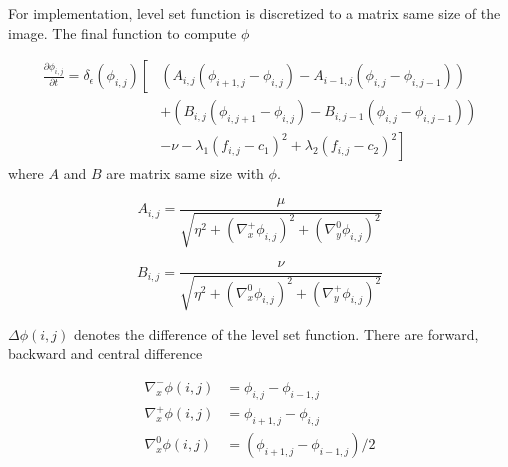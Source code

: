 For implementation, level set function is discretized to a matrix same size of the image. The final function to compute $\phi$

\begin{equation}
    \begin{aligned}
            \frac{\partial \phi_{i, j}}{\partial t} = 
            \delta_{\epsilon}(\phi_{i,j}) \left[ \right.
                    & \left( A_{i,j}(\phi_{i+1, j} - \phi_{i,j})
                            - A_{i-1,j}(\phi_{i, j} - \phi_{i,j-1}) \right) \\
                    & + \left( B_{i, j}(\phi_{i, j+1} - \phi_{i, j}) - 
                             B_{i, j-1}(\phi_{i, j} - \phi_{i, j-1}) \right) \\
                    & - \nu - 
                        \lambda_1(f_{i,j} - c_1)^2 +
                        \lambda_2(f_{i, j} - c_2)^2 
                        \left. \right]
    \end{aligned}
    \label{eq:phi}
\end{equation}
where $A$ and $B$ are matrix same size with $\phi$.

\begin{equation}
    A_{i, j} = \frac{\mu}
                {\sqrt{\eta^2 
                       + (\nabla_x^+ \phi_{i, j} )^2
                       + (\nabla_y^0 \phi_{i, j} )^2 }
                }
    \label{eq:a}
\end{equation}

\begin{equation}
    B_{i, j} = \frac{\nu}
                    {\sqrt{\eta^2 
                            + (\nabla_x^0 \phi_{i, j} )^2
                            + (\nabla_y^+ \phi_{i, j} )^2 } 
                    }
    \label{eq:b}
\end{equation}



$\Delta \phi(i, j)$ denotes the difference of the level set function. There are forward, backward and central difference

\begin{equation}
    \begin{aligned}
        \nabla_x^- \phi(i, j) &= \phi_{i, j} - \phi_{i-1, j} \\
        \nabla_x^+ \phi(i, j) &= \phi_{i+1, j} - \phi_{i, j} \\
        \nabla_x^0 \phi(i, j) &= (\phi_{i+1, j} - \phi_{i-1, j} ) / 2
    \end{aligned}
\end{equation}

